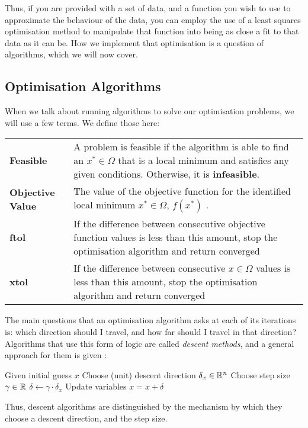 Thus, if you are provided with a set of data, and a function you wish to use to approximate the behaviour of the data, you can 
employ the use of a least squares optimisation method to manipulate that function into being as close a fit to that data as 
it can be. How we implement that optimisation is a question of algorithms, which we will now cover.

\subsection{Optimisation Algorithms}

\begin{notn}
    When we talk about running algorithms to solve our optimisation problems, we will use a few terms. We define those here:    
    \begin{table}[h!]
        \begin{tabular}{p{3.5cm}|p{10cm}}
            \textbf{Feasible} & A problem is feasible if the algorithm is able to find an $x^* \in \Omega$ that is a local minimum and satisfies any given conditions. Otherwise, it is \textbf{infeasible}. \\
            \textbf{Objective Value} & The value of the objective function for the identified local minimum $x^* \in \Omega$, $f(x^*)$ . \\
            \textbf{ftol} & If the difference between consecutive objective function values is less than this amount, stop the optimisation algorithm and return converged \\
            \textbf{xtol} & If the difference between consecutive $x \in \Omega$ values is less than this amount, stop the optimisation algorithm and return converged \\
        \end{tabular}
    \end{table}
    
\end{notn}

The main questions that an optimisation algorithm asks at each of its iterations is: which direction should I travel, and how far 
should I travel in that direction? Algorithms that use this form of logic are called \textit{descent methods}, and a 
general approach for them is given \cite{carlone-least-squares}:

\begin{algorithm}[h!]
    \begin{algorithmic}[1]
        \State Given initial guess $x$
            \State Choose (unit) descent direction $\delta_x \in \mathbb{R}^n$
            \State Choose step size $\gamma \in \mathbb{R}$
            \State $\delta \leftarrow \gamma \cdot \delta_x$
            \State Update variables $x = x + \delta$
        \EndWhile
    \end{algorithmic}
\end{algorithm}
Thus, descent algorithms are distinguished by the mechanism by which they choose a descent direction, and the step size.

